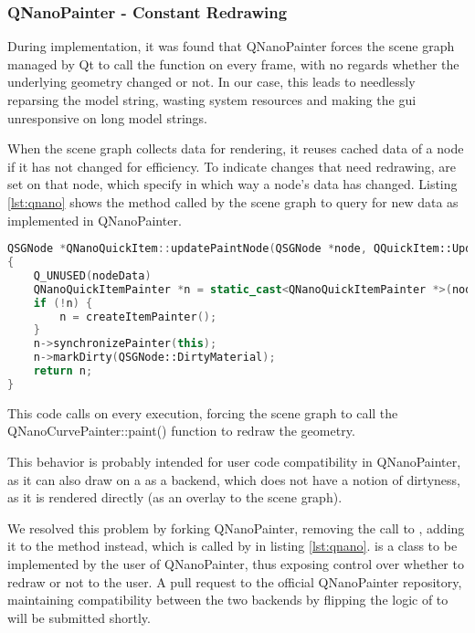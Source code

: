 \subsubsection{QNanoPainter - Constant Redrawing}
During implementation, it was found that QNanoPainter forces the scene graph managed by Qt to call the  function on every frame, with no regards whether the underlying geometry changed or not. In our case, this leads to needlessly reparsing the model string, wasting system resources and making the \gls{gui} unresponsive on long model strings.

When the scene graph collects data for rendering, it reuses cached data of a node if it has not changed for efficiency. To indicate changes that need redrawing,  are set on that node, which specify in which way a node's data has changed. Listing \ref{lst:qnano} shows the method called by the scene graph to query for new data as implemented in QNanoPainter. 

\begin{lstlisting}[language=c++,caption=QNanoQuickItem as of commit de45f31e,label=lst:qnano,float]
QSGNode *QNanoQuickItem::updatePaintNode(QSGNode *node, QQuickItem::UpdatePaintNodeData *nodeData)
{
    Q_UNUSED(nodeData)
    QNanoQuickItemPainter *n = static_cast<QNanoQuickItemPainter *>(node);
    if (!n) {
        n = createItemPainter();
    }
    n->synchronizePainter(this);
    n->markDirty(QSGNode::DirtyMaterial);
    return n;
}
\end{lstlisting}
This code calls  on every execution, forcing the scene graph to call the QNanoCurvePainter::paint() function to redraw the geometry.

This behavior is probably intended for user code compatibility in QNanoPainter, as it can also draw on a  as a backend, which does not have a notion of dirtyness, as it is rendered directly (as an overlay to the scene graph).

We resolved this problem by forking QNanoPainter, removing the call to , adding it to the  method instead, which is called by  in listing \ref{lst:qnano}.  is a class to be implemented by the user of QNanoPainter, thus exposing control over whether to redraw or not to the user. A pull request to the official QNanoPainter repository, maintaining compatibility between the two backends by flipping the logic of  to  will be submitted shortly.

